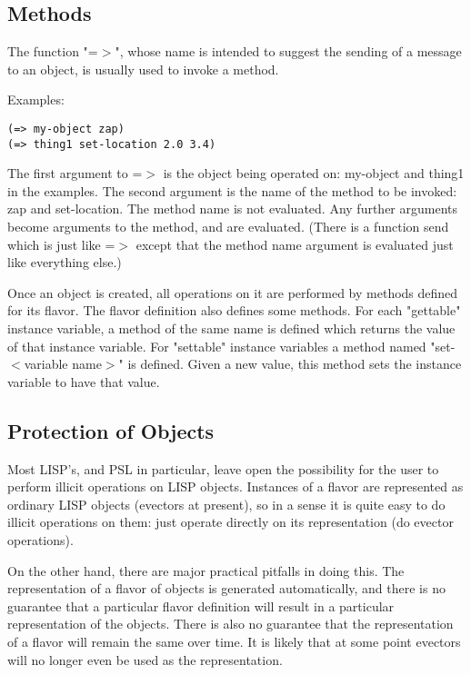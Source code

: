 \subsection{Methods}

  The  function  "=$>$", whose name is intended to suggest the
sending of a message to an object, is usually used to invoke  
a method.

Examples:

\begin{verbatim}
(=> my-object zap)
(=> thing1 set-location 2.0 3.4)
\end{verbatim}

The  first  argument  to  =$>$  is  the  object being operated on:
my-object and thing1 in the examples.  The  second  argument  is
the name of the method to be invoked: zap and set-location.  The
method  name  is  not  evaluated.   Any further arguments become
arguments to  the  method,  and  are  evaluated.   (There  is  a
function  send which is just like =$>$ except that the method name
argument is evaluated just like everything else.)

  Once an object is created, all operations on it are  performed
by  methods  defined for its flavor.  The flavor definition also
defines some methods.  For each "gettable" instance variable,  a
method  of  the  same name is defined which returns the value of
that instance variable.  For  "settable"  instance  variables  a
method  named  "set-$<$variable  name$>$" is defined. Given a new
value, this method sets the instance variable to have that value.

\subsection{Protection of Objects}

  Most LISP's, and PSL in particular, leave open the possibility
for  the  user  to  perform  illicit operations on LISP objects.
Instances of a flavor are represented as ordinary  LISP  objects
(evectors  at  present),  so  in  a sense it is quite easy to do
illicit  operations  on  them:  just  operate  directly  on  its
representation (do evector operations).

  On the other hand, there are major practical pitfalls in doing
this.    The  representation of a flavor of objects is generated
automatically, and there  is  no  guarantee  that  a  particular
flavor  definition will result in a particular representation of
the objects.  There is also no guarantee that the representation
of a flavor will remain the same over time.  It is  likely  that
at  some  point  evectors  will  no  longer  even be used as the
representation.

